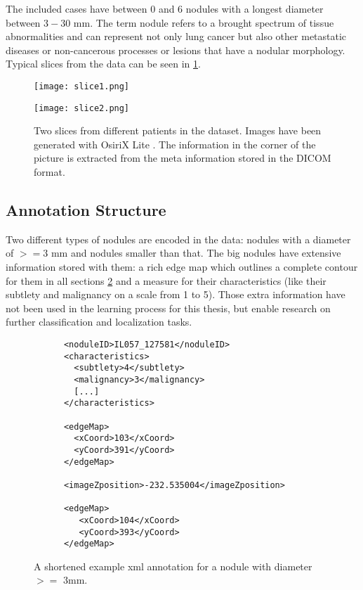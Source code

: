 \documentclass[../Thesis.tex]{subfiles}
\begin{document}
The included cases have between 0 and 6 nodules with a longest diameter between $3-30$ mm. The term nodule refers to a brought spectrum of tissue abnormalities and can represent not only lung cancer but also other metastatic diseases or non-cancerous processes or lesions that have a nodular morphology. Typical slices from the data can be seen in \ref{fig:slices}.

\begin{figure}[!tbp]
\centering
\begin{minipage}[b]{0.7\textwidth}
	\texttt{[image: slice1.png]}
\end{minipage}
\begin{minipage}[b]{0.7\textwidth}
	\texttt{[image: slice2.png]}
\end{minipage}
\caption{Two slices from different patients in the dataset. Images have been generated with OsiriX Lite \cite{rosset2004osirix}. The information in the corner of the picture is extracted from the meta information stored in the DICOM format.}
\label{fig:slices}
\end{figure}

\subsection{Annotation Structure}
Two different types of nodules are encoded in the data: nodules with a diameter of $>=3$ mm and nodules smaller than that. The big nodules have extensive information stored with them: a rich edge map which outlines a complete contour for them in all sections \ref{fig:bigNod} and a measure for their characteristics (like their subtlety and malignancy on a scale from 1 to 5). Those extra information have not been used in the learning process for this thesis, but enable research on further classification and localization tasks.

\begin{figure}
\begin{lstlisting}
      <noduleID>IL057_127581</noduleID>
      <characteristics>
        <subtlety>4</subtlety>
        <malignancy>3</malignancy>
        [...]
      </characteristics>
      
      <edgeMap>
        <xCoord>103</xCoord>
        <yCoord>391</yCoord>
      </edgeMap>
 
      <imageZposition>-232.535004</imageZposition>
       
      <edgeMap>
         <xCoord>104</xCoord>
         <yCoord>393</yCoord>
      </edgeMap>
\end{lstlisting}
\caption{A shortened example xml annotation for a nodule with diameter $>=$ 3mm.}
\label{fig:bigNod}
\end{figure}
\end{document}

